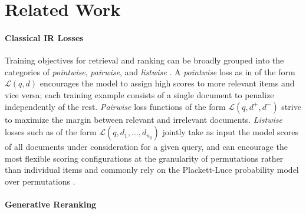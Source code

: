 \documentclass[11pt, a4paper, onecolumn, confidential, copyright, gdm]{google}
\begin{document}
\section{Related Work}\label{sec:related-work}

\paragraph{Classical IR Losses} Training objectives for retrieval and ranking can be broadly grouped into the categories of \textit{pointwise}, \textit{pairwise}, and \textit{listwise} \citep{liu2009learning}. A \textit{pointwise} loss as in \citet{chen2009ranking} of the form $\mathcal{L}(q, d)$ encourages the model to assign high scores to more relevant items and vice versa; each training example consists of a single document to penalize independently of the rest. \textit{Pairwise} loss functions \citep{cao2007learning} of the form $\mathcal{L}(q, d^{+}, d^{-})$ strive to maximize the margin between relevant and irrelevant documents. \textit{Listwise} losses such as \cite{xia2008listwise} of the form $\mathcal{L}(q, d_1, \ldots, d_{n_q})$ jointly take as input the model scores of all documents under consideration for a given query, and can encourage the most flexible scoring configurations at the granularity of permutations rather than individual items and commonly rely on the Plackett-Luce probability model over permutations \citep{luce1959individual, plackett1975analysis}.%

\vspace{-0.6em}
\paragraph{Generative Reranking}
\end{document}
